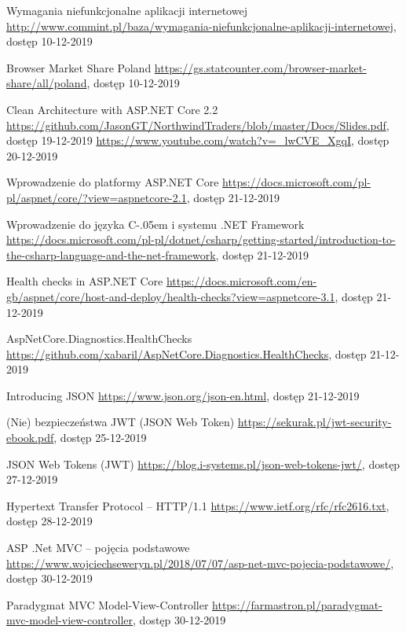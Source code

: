 \documentclass[12pt]{article}
\newcommand{\Csharp}{%
  {\settoheight{\dimen0}{C}C\kern-.05em \resizebox{!}{\dimen0}{\raisebox{\depth}{\# }}}}
\numberwithin{figure}{section}
\begin{document}
\begin{sloppypar}
\begin{thebibliography}{99}
    Wymagania niefunkcjonalne aplikacji internetowej
    \url{http://www.commint.pl/baza/wymagania-niefunkcjonalne-aplikacji-internetowej}, dostęp 10-12-2019
    
    Browser Market Share Poland
    \url{https://gs.statcounter.com/browser-market-share/all/poland}, dostęp 10-12-2019
    
    Clean Architecture with ASP.NET Core 2.2
    \url{https://github.com/JasonGT/NorthwindTraders/blob/master/Docs/Slides.pdf}, dostęp 19-12-2019
    \url{https://www.youtube.com/watch?v=_lwCVE_XgqI}, dostęp 20-12-2019
    
    Wprowadzenie do platformy ASP.NET Core
    \url{https://docs.microsoft.com/pl-pl/aspnet/core/?view=aspnetcore-2.1}, dostęp 21-12-2019
    
    Wprowadzenie do języka \Csharp i systemu .NET Framework
    \url{https://docs.microsoft.com/pl-pl/dotnet/csharp/getting-started/introduction-to-the-csharp-language-and-the-net-framework}, dostęp 21-12-2019
    
    Health checks in ASP.NET Core
    \url{https://docs.microsoft.com/en-gb/aspnet/core/host-and-deploy/health-checks?view=aspnetcore-3.1}, dostęp 21-12-2019
    
    AspNetCore.Diagnostics.HealthChecks
    \url{https://github.com/xabaril/AspNetCore.Diagnostics.HealthChecks}, dostęp 21-12-2019
    
    Introducing JSON
    \url{https://www.json.org/json-en.html}, dostęp 21-12-2019
    
    (Nie) bezpieczeństwa JWT (JSON Web Token)
    \url{https://sekurak.pl/jwt-security-ebook.pdf}, dostęp 25-12-2019
    
    JSON Web Tokens (JWT)
    \url{https://blog.i-systems.pl/json-web-tokens-jwt/}, dostęp 27-12-2019
    
    Hypertext Transfer Protocol -- HTTP/1.1
    \url{https://www.ietf.org/rfc/rfc2616.txt}, dostęp 28-12-2019
    
    ASP .Net MVC – pojęcia podstawowe
    \url{https://www.wojciechseweryn.pl/2018/07/07/asp-net-mvc-pojecia-podstawowe/}, dostęp 30-12-2019
    
    Paradygmat MVC Model-View-Controller
    \url{https://farmastron.pl/paradygmat-mvc-model-view-controller}, dostęp 30-12-2019

    \end{thebibliography}
\end{sloppypar}
\end{document}
